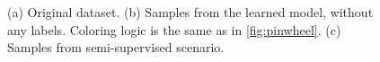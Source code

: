\begin{figure}[!htb]
  \begin{subfigmatrix}{2}
  \end{subfigmatrix}
    \caption{(a) Original dataset. (b) Samples from the learned model, without
    any labels. Coloring logic is the same as in \ref{fig:pinwheel}. (c) Samples
    from semi-supervised scenario.}
\label{fig:twocircles}
\end{figure}


